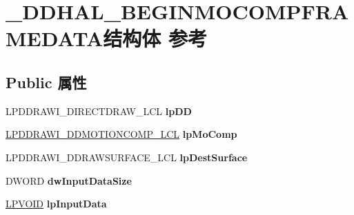 \hypertarget{struct___d_d_h_a_l___b_e_g_i_n_m_o_c_o_m_p_f_r_a_m_e_d_a_t_a}{}\section{\+\_\+\+D\+D\+H\+A\+L\+\_\+\+B\+E\+G\+I\+N\+M\+O\+C\+O\+M\+P\+F\+R\+A\+M\+E\+D\+A\+T\+A结构体 参考}
\label{struct___d_d_h_a_l___b_e_g_i_n_m_o_c_o_m_p_f_r_a_m_e_d_a_t_a}
\subsection*{Public 属性}
\begin{DoxyCompactItemize}
\item 
\mbox{\label{struct___d_d_h_a_l___b_e_g_i_n_m_o_c_o_m_p_f_r_a_m_e_d_a_t_a_a436a19062691f3c895cfcde87abcbcce}} 
L\+P\+D\+D\+R\+A\+W\+I\+\_\+\+D\+I\+R\+E\+C\+T\+D\+R\+A\+W\+\_\+\+L\+CL {\bfseries lp\+DD}
\item 
\mbox{\label{struct___d_d_h_a_l___b_e_g_i_n_m_o_c_o_m_p_f_r_a_m_e_d_a_t_a_a418b00ede98c03c3a841aa2b67dee617}} 
\hyperlink{struct___d_d_r_a_w_i___d_d_m_o_t_i_o_n_c_o_m_p___l_c_l}{L\+P\+D\+D\+R\+A\+W\+I\+\_\+\+D\+D\+M\+O\+T\+I\+O\+N\+C\+O\+M\+P\+\_\+\+L\+CL} {\bfseries lp\+Mo\+Comp}
\item 
\mbox{\label{struct___d_d_h_a_l___b_e_g_i_n_m_o_c_o_m_p_f_r_a_m_e_d_a_t_a_a6ea14309b60456172550545927b9f7da}} 
L\+P\+D\+D\+R\+A\+W\+I\+\_\+\+D\+D\+R\+A\+W\+S\+U\+R\+F\+A\+C\+E\+\_\+\+L\+CL {\bfseries lp\+Dest\+Surface}
\item 
\mbox{\label{struct___d_d_h_a_l___b_e_g_i_n_m_o_c_o_m_p_f_r_a_m_e_d_a_t_a_aed711b1068736ae2b2e6966a8218822e}} 
D\+W\+O\+RD {\bfseries dw\+Input\+Data\+Size}
\item 
\mbox{\label{struct___d_d_h_a_l___b_e_g_i_n_m_o_c_o_m_p_f_r_a_m_e_d_a_t_a_a1a3a83757fab6937c86248509b10259d}} 
\hyperlink{interfacevoid}{L\+P\+V\+O\+ID} {\bfseries lp\+Input\+Data}

\end{DoxyCompactItemize}
